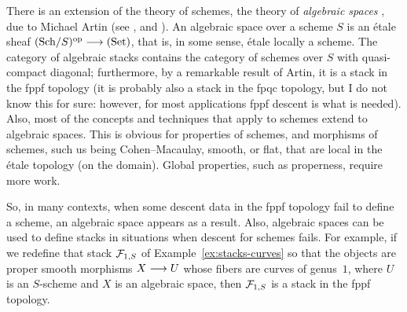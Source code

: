 \begin{4   STACKS}
\begin{4.4 Descent along torsors}
\begin{remark}\label{rmk:algebraic-spaces}
There is an extension of the theory of schemes, the theory of \emph{algebraic spaces}%
, due to Michael Artin (see \cite{artin-algspaces}, \cite{artinrep} and \cite{knutson}). An algebraic space over a scheme $S$ is an \'etale sheaf $\catsch{S}\op \arr \catset$, that is, in some sense, \'etale locally a scheme. The category of algebraic stacks contains the category of schemes over $S$ with quasi-compact diagonal; furthermore, by a remarkable result of Artin, it is a stack in the fppf topology (it is probably also a stack in the fpqc topology, but I do not know this for sure: however, for most applications fppf descent is what is needed). Also, most of the concepts and techniques that apply to schemes extend to algebraic spaces. This is obvious for properties of schemes, and morphisms of schemes, such us being Cohen--Macaulay, smooth, or flat, that are local in the \'etale topology (on the domain). Global properties, such as properness, require more work.

So, in many contexts, when some descent data in the fppf topology fail to define a scheme, an algebraic space appears as a result. Also, algebraic spaces can be used to define stacks in situations when descent for schemes fails. For example, if we redefine that stack $\mathcal{F}_{1,S}$ of Example~\ref{ex:stacks-curves} so that the objects are proper smooth morphisms $X \arr U$ whose fibers are curves of genus~$1$, where $U$ is an $S$-scheme and $X$ is an algebraic space, then $\mathcal{F}_{1,S}$ is a stack in the fppf topology.
\end{remark}


\end{4.4 Descent along torsors}
\end{4   STACKS}





\nocite{moerdijk02}
\nocite{knus-ojanguren-descent}
\nocite{benabou-roubaud}
\nocite{giraud}
\nocite{giraud-descent}
